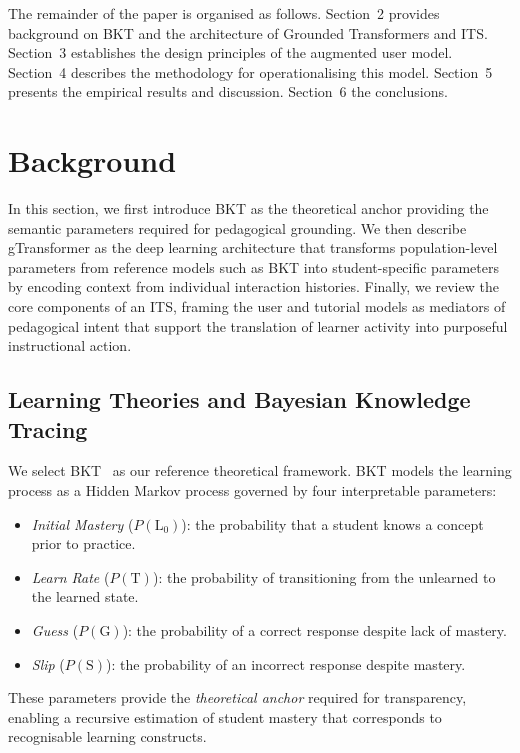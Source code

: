 \documentclass[runningheads]{llncs}
\begin{document}
The remainder of the paper is organised as follows. Section~2 provides background on BKT and the architecture of Grounded Transformers and ITS. Section~3 establishes the design principles of the augmented user model. Section~4 describes the methodology for operationalising this model. Section~5 presents the empirical results and discussion. Section~6  the conclusions.


%

\section{Background}

In this section, we first introduce BKT as the theoretical anchor providing the semantic parameters required for pedagogical grounding. We then describe gTransformer as the deep learning architecture that transforms population-level parameters from reference models such as BKT into student-specific parameters by encoding context from individual interaction histories. Finally, we review the core components of an ITS, framing the user and tutorial models as mediators of pedagogical intent that support the translation of learner activity into purposeful instructional action.

\subsection{Learning Theories and Bayesian Knowledge Tracing}

We select BKT~\cite{corbett1994knowledge} as our reference theoretical framework. BKT models the learning process as a Hidden Markov process governed by four interpretable parameters:

\begin{itemize}
    \item \textit{Initial Mastery} ($P(\text{L}_0)$): the probability that a student knows a concept prior to practice.
    \item \textit{Learn Rate} ($P(\text{T})$): the probability of transitioning from the unlearned to the learned state.
    \item \textit{Guess} ($P(\text{G})$): the probability of a correct response despite lack of mastery.
    \item \textit{Slip} ($P(\text{S})$): the probability of an incorrect response despite mastery.
\end{itemize}

These parameters provide the \textit{theoretical anchor} required for transparency, enabling a recursive estimation of student mastery that corresponds to recognisable learning constructs.
\end{document}
